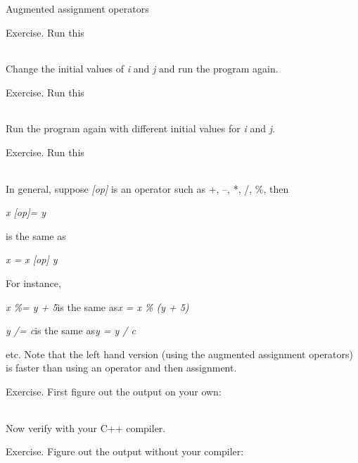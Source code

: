 \documentclass[
]{article}
\begin{document}
\begin{longtable}[]{@{}@{}}
\toprule
\endhead
\bottomrule
\end{longtable}

Augmented assignment operators

Exercise. Run this

\begin{longtable}[]{@{}@{}}
\toprule
\endhead
\bottomrule
\end{longtable}

Change the initial values of \emph{i }and\emph{ j} and run the program
again.

Exercise. Run this

\begin{longtable}[]{@{}@{}}
\toprule
\endhead
\bottomrule
\end{longtable}

Run the program again with different initial values for \emph{i} and
\emph{j}.

Exercise. Run this

\begin{longtable}[]{@{}@{}}
\toprule
\endhead
\bottomrule
\end{longtable}

In general, suppose \emph{{[}op{]}} is an operator such as +, --, *, /,
\%, then

\emph{x {[}op{]}= y}

is the same as

\emph{x = x {[}op{]} y}

For instance,

\emph{x \%= y + 5}is the same as\emph{x = x \% (y + 5)}

\emph{y /= c}is the same as\emph{y = y / c}

etc. Note that the left hand version (using the augmented assignment
operators) is faster than using an operator and then assignment.

Exercise. First figure out the output on your own:

\begin{longtable}[]{@{}@{}}
\toprule
\endhead
\bottomrule
\end{longtable}

Now verify with your C++ compiler.

Exercise. Figure out the output without your compiler:

\begin{longtable}[]{@{}@{}}
\toprule
\endhead
\bottomrule
\end{longtable}
\end{document}
